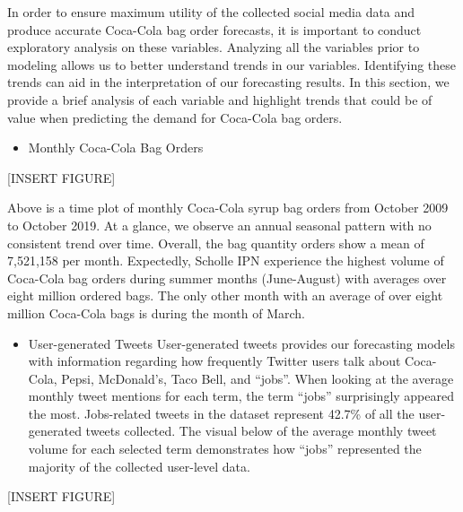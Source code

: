 \documentclass[12pt,oneside]{chicagocapstone}
\providecommand{\tightlist}{%
  \setlength{\itemsep}{0pt}\setlength{\parskip}{0pt}}
\begin{document}
In order to ensure maximum utility of the collected social media data and produce accurate Coca-Cola bag order forecasts, it is important to conduct exploratory analysis on these variables. Analyzing all the variables prior to modeling allows us to better understand trends in our variables. Identifying these trends can aid in the interpretation of our forecasting results. In this section, we provide a brief analysis of each variable and highlight trends that could be of value when predicting the demand for Coca-Cola bag orders.
\begin{itemize}
\tightlist
\item
  Monthly Coca-Cola Bag Orders
\end{itemize}
{[}INSERT FIGURE{]}

Above is a time plot of monthly Coca-Cola syrup bag orders from October 2009 to October 2019. At a glance, we observe an annual seasonal pattern with no consistent trend over time. Overall, the bag quantity orders show a mean of 7,521,158 per month. Expectedly, Scholle IPN experience the highest volume of Coca-Cola bag orders during summer months (June-August) with averages over eight million ordered bags. The only other month with an average of over eight million Coca-Cola bags is during the month of March.
\begin{itemize}
\tightlist
\item
  User-generated Tweets
  User-generated tweets provides our forecasting models with information regarding how frequently Twitter users talk about Coca-Cola, Pepsi, McDonald's, Taco Bell, and ``jobs''. When looking at the average monthly tweet mentions for each term, the term ``jobs'' surprisingly appeared the most. Jobs-related tweets in the dataset represent 42.7\% of all the user-generated tweets collected. The visual below of the average monthly tweet volume for each selected term demonstrates how ``jobs'' represented the majority of the collected user-level data.
\end{itemize}
{[}INSERT FIGURE{]}
\end{document}
